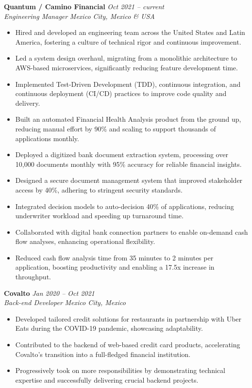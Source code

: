 \documentclass[a4paper,10pt]{article}
\begin{document}
\textbf{Quantum / Camino Financial} \hfill \textit{Oct 2021 -- current}\\
\textit{Engineering Manager} \hfill \textit{Mexico City, Mexico \& USA}\\
\begin{itemize}[leftmargin=0.5cm, topsep=0pt, parsep=0pt, itemsep=2pt]
	\item Hired and developed an engineering team across the United States and
	      Latin America, fostering a culture of technical rigor and continuous
	      improvement.
	\item Led a system design overhaul, migrating from a monolithic architecture
	      to AWS-based microservices, significantly reducing feature development time.
	\item Implemented Test-Driven Development (TDD), continuous integration, and
	      continuous deployment (CI/CD) practices to improve code quality and delivery.
	\item Built an automated Financial Health Analysis product from the ground up,
	      reducing manual effort by 90\% and scaling to support thousands of
	      applications monthly.
	\item Deployed a digitized bank document extraction system, processing over
	      10,000 documents monthly with 95\% accuracy for reliable financial insights.
	\item Designed a secure document management system that improved stakeholder
	      access by 40\%, adhering to stringent security standards.
	\item Integrated decision models to auto-decision 40\% of applications,
	      reducing underwriter workload and speeding up turnaround time.
	\item Collaborated with digital bank connection partners to enable on-demand
	      cash flow analyses, enhancing operational flexibility.
	\item Reduced cash flow analysis time from 35 minutes to 2 minutes per
	      application, boosting productivity and enabling a 17.5x increase in
	      throughput.
\end{itemize}

\textbf{Covalto} \hfill \textit{Jan 2020 -- Oct 2021}\\
\textit{Back-end Developer} \hfill \textit{Mexico City, Mexico}\\
\begin{itemize}[leftmargin=0.5cm, topsep=0pt, parsep=0pt, itemsep=2pt]
	\item Developed tailored credit solutions for restaurants in partnership with
	      Uber Eats during the COVID-19 pandemic, showcasing adaptability.
	\item Contributed to the backend of web-based credit card products,
	      accelerating Covalto’s transition into a full-fledged financial institution.
	\item Progressively took on more responsibilities by demonstrating technical
	      expertise and successfully delivering crucial backend projects.
\end{itemize}
\end{document}
